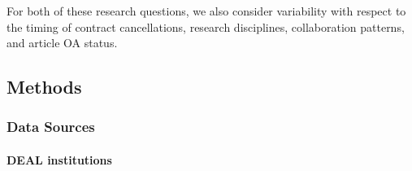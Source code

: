 \documentclass[
]{article}
\begin{document}
For both of these research questions, we also consider variability with respect to the timing of contract cancellations, research disciplines, collaboration patterns, and article OA status.

\hypertarget{methods}{%
\subsection{Methods}\label{methods}}

\hypertarget{data-sources}{%
\subsubsection{Data Sources}\label{data-sources}}

\hypertarget{deal-institutions}{%
\paragraph{DEAL institutions}\label{deal-institutions}}
\end{document}
